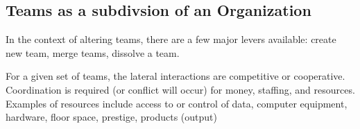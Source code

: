 

\subsection{Teams as a subdivsion of an Organization}

\cite{2015_Katzenbach}

In the context of altering teams, there are a few major levers available: create new team, merge teams, dissolve a team. 

For a given set of teams, the lateral interactions are competitive or cooperative. Coordination is required (or conflict will occur) for money, staffing, and resources. Examples of resources include access to or control of data, computer equipment, hardware, floor space, prestige, products (output)